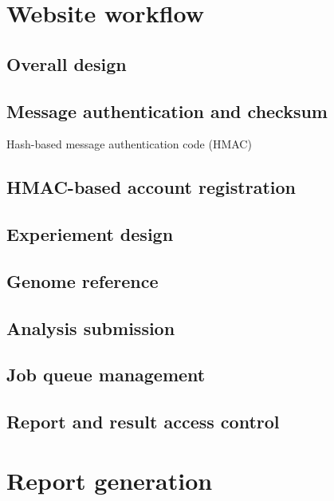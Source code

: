 



\section{Website workflow}



\subsection{Overall design}

\subsection{Message authentication and checksum}

Hash-based message authentication code (HMAC)

\subsection{HMAC-based account registration}

\subsection{Experiement design}

\subsection{Genome reference}

\subsection{Analysis submission}

\subsection{Job queue management}

\subsection{Report and result access control}



\section{Report generation}

